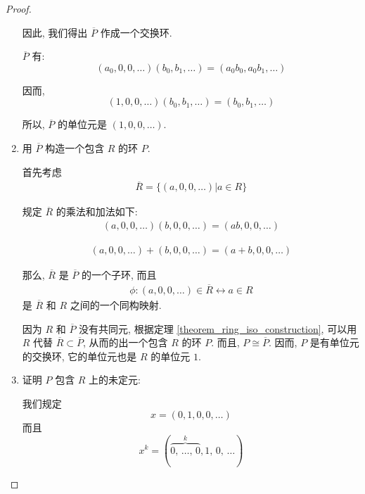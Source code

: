 \documentclass[utf8]{ctexbook}
\theoremstyle{definition}
\begin{document}
\begin{proof}
\begin{enumerate}
{因此, 我们得出 $\overline{P}$ 作成一个交换环.

$\overline{P}$ 有:
\begin{equation}
(a_0, 0, 0, \ldots) (b_0, b_1, \ldots) = (a_0 b_0, a_0 b_1, \ldots )
\end{equation}

因而, 
\begin{equation}
(1,0,0,\ldots) (b_0, b_1, \ldots) = (b_0, b_1, \ldots ) \nonumber
\end{equation}

所以, $\overline{P}$ 的单位元是 $(1, 0, 0, \ldots)$.

}
\item{用 $\overline{P}$ 构造一个包含 $R$ 的环 $P$.

首先考虑 
\begin{align*}
\overline{R} = \{ (a, 0, 0, \ldots) | a \in R \}
\end{align*}

规定 $\overline{R} $ 的乘法和加法如下:
\begin{align*}
(a, 0, 0, \ldots) (b, 0, 0, \ldots) = (ab, 0, 0, \ldots)
\end{align*}

\begin{align*}
(a, 0, 0, \ldots) + (b, 0, 0, \ldots) = (a + b, 0, 0, \ldots)
\end{align*}

那么, $\overline{R}$ 是 $\overline{P}$ 的一个子环, 而且
\begin{align*}
\phi : (a,0,0, \ldots) \in \overline{R} \longleftrightarrow a \in R 
\end{align*}
是 $\overline{R}$ 和 $R$ 之间的一个同构映射.

因为 $R$ 和 $\overline{P}$ 没有共同元, 根据定理 \ref{theorem_ring_iso_construction}, 可以用 $R$ 代替 $\overline{R} \subset \overline{P} $, 从而的出一个包含 $R$ 的环 $P$. 而且, $P \cong \overline{P}$. 因而, $P$ 是有单位元的交换环, 它的单位元也是 $R$ 的单位元 $1$.
}
\item{证明 $P$ 包含 $R$ 上的未定元:

我们规定
\begin{equation}
x = (0, 1, 0, 0, \ldots ) \nonumber
\end{equation}
而且
\begin{equation}
x^k = (  \overbrace{0, \, \ldots, \, 0}^{k}, 1, \, 0, \, \ldots ) \label{eq_xk_undeterminate_ring}
\end{equation}

}
\end{enumerate}
\end{proof}
\end{document}
